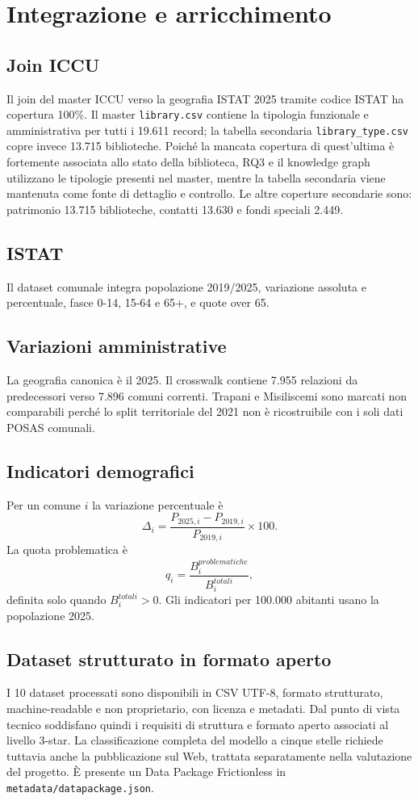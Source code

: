 \documentclass[11pt,a4paper]{article}
\begin{document}
\section{Integrazione e arricchimento}
\subsection{Join ICCU}
Il join del master ICCU verso la geografia ISTAT 2025 tramite codice ISTAT ha copertura 100\%. Il master \texttt{library.csv} contiene la tipologia funzionale e amministrativa per tutti i 19.611 record; la tabella secondaria \texttt{library\_type.csv} copre invece 13.715 biblioteche. Poiché la mancata copertura di quest'ultima è fortemente associata allo stato della biblioteca, RQ3 e il knowledge graph utilizzano le tipologie presenti nel master, mentre la tabella secondaria viene mantenuta come fonte di dettaglio e controllo. Le altre coperture secondarie sono: patrimonio 13.715 biblioteche, contatti 13.630 e fondi speciali 2.449.

\subsection{ISTAT}
Il dataset comunale integra popolazione 2019/2025, variazione assoluta e percentuale, fasce 0-14, 15-64 e 65+, e quote over 65.

\subsection{Variazioni amministrative}
La geografia canonica è il 2025. Il crosswalk contiene 7.955 relazioni da predecessori verso 7.896 comuni correnti. Trapani e Misiliscemi sono marcati non comparabili perché lo split territoriale del 2021 non è ricostruibile con i soli dati POSAS comunali.

\subsection{Indicatori demografici}
Per un comune $i$ la variazione percentuale è
\[
\Delta_i = \frac{P_{2025,i}-P_{2019,i}}{P_{2019,i}}\times 100.
\]
La quota problematica è
\[
q_i = \frac{B^{problematiche}_i}{B^{totali}_i},
\]
definita solo quando $B^{totali}_i>0$. Gli indicatori per 100.000 abitanti usano la popolazione 2025.

\subsection{Dataset strutturato in formato aperto}
I 10 dataset processati sono disponibili in CSV UTF-8, formato strutturato, machine-readable e non proprietario, con licenza e metadati. Dal punto di vista tecnico soddisfano quindi i requisiti di struttura e formato aperto associati al livello 3-star. La classificazione completa del modello a cinque stelle richiede tuttavia anche la pubblicazione sul Web, trattata separatamente nella valutazione del progetto. È presente un Data Package Frictionless in \texttt{metadata/datapackage.json}.
\end{document}
